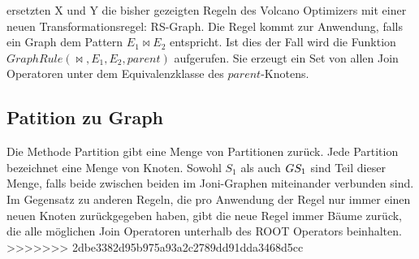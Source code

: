 ersetzten X und Y die bisher gezeigten Regeln des Volcano Optimizers mit einer neuen Transformationsregel: RS-Graph. Die Regel kommt zur Anwendung, falls ein Graph dem Pattern $E_1 \Join E_2$ entspricht. Ist dies der Fall wird die Funktion $GraphRule(\Join, E_1, E_2, parent)$ aufgerufen. Sie erzeugt ein Set von allen Join Operatoren unter dem Equivalenzklasse des $parent$-Knotens.




\subsubsection{}



\subsection{Patition zu Graph}



Die Methode Partition gibt eine Menge von Partitionen zurück. Jede Partition bezeichnet eine Menge von Knoten. Sowohl $S_1$ als auch $G\\S_1$ sind Teil dieser Menge, falls beide zwischen beiden im Joni-Graphen miteinander verbunden sind. Im Gegensatz zu anderen Regeln, die pro Anwendung der Regel nur immer einen neuen Knoten zurückgegeben haben, gibt die neue Regel immer Bäume zurück, die alle möglichen Join Operatoren unterhalb des ROOT Operators beinhalten.
>>>>>>> 2dbe3382d95b975a93a2c2789dd91dda3468d5cc
